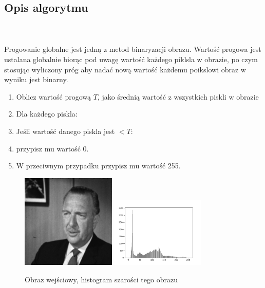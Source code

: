 \documentclass[final,a4paper,openany,12pt]{mwbk}
\begin{document}
\subsection*{Opis algorytmu}
\hfill
\\\\
\indent Progowanie globalne jest jedną z metod binaryzacji obrazu. Wartość progowa jest ustalana globalnie biorąc pod uwagę wartość każdego piklsla w obrazie, po czym stosując wyliczony próg aby nadać nową wartość każdemu poikslowi obraz w wyniku jest binarny.
\begin{enumerate}
	\item Oblicz wartość progową $T$, jako średnią wartość z wszystkich piskli w obrazie
	\item Dla każdego piskla:
	\item Jeśli wartość danego piskla jest $< T$:
	\item przypisz mu wartość $0$.
	\item W przeciwnym przypadku przypisz mu wartość 255.
\end{enumerate}

\begin{figure}[H]
	\begin{center}
		\includegraphics[width=0.4\textwidth]{gentelman_gray}
		\includegraphics[width=0.4\textwidth]{gentelman_gray_histogram}
	\end{center}
	\caption{Obraz wejściowy, histogram szarości tego obrazu}
\end{figure}
\end{document}

